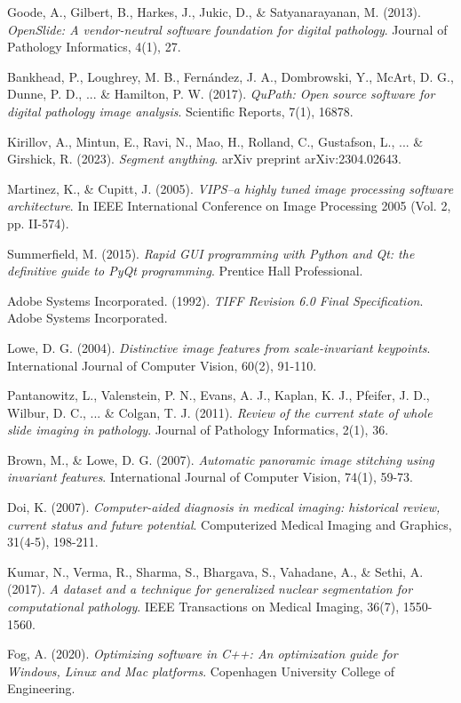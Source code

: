 \documentclass[12pt,a4paper]{report}
\begin{document}
\begin{thebibliography}{20}

Goode, A., Gilbert, B., Harkes, J., Jukic, D., \& Satyanarayanan, M. (2013). 
\textit{OpenSlide: A vendor-neutral software foundation for digital pathology}. 
Journal of Pathology Informatics, 4(1), 27.

Bankhead, P., Loughrey, M. B., Fernández, J. A., Dombrowski, Y., McArt, D. G., Dunne, P. D., ... \& Hamilton, P. W. (2017). 
\textit{QuPath: Open source software for digital pathology image analysis}. 
Scientific Reports, 7(1), 16878.

Kirillov, A., Mintun, E., Ravi, N., Mao, H., Rolland, C., Gustafson, L., ... \& Girshick, R. (2023). 
\textit{Segment anything}. 
arXiv preprint arXiv:2304.02643.

Martinez, K., \& Cupitt, J. (2005). 
\textit{VIPS–a highly tuned image processing software architecture}. 
In IEEE International Conference on Image Processing 2005 (Vol. 2, pp. II-574).

Summerfield, M. (2015). 
\textit{Rapid GUI programming with Python and Qt: the definitive guide to PyQt programming}. 
Prentice Hall Professional.

Adobe Systems Incorporated. (1992). 
\textit{TIFF Revision 6.0 Final Specification}. 
Adobe Systems Incorporated.

Lowe, D. G. (2004). 
\textit{Distinctive image features from scale-invariant keypoints}. 
International Journal of Computer Vision, 60(2), 91-110.

Pantanowitz, L., Valenstein, P. N., Evans, A. J., Kaplan, K. J., Pfeifer, J. D., Wilbur, D. C., ... \& Colgan, T. J. (2011). 
\textit{Review of the current state of whole slide imaging in pathology}. 
Journal of Pathology Informatics, 2(1), 36.

Brown, M., \& Lowe, D. G. (2007). 
\textit{Automatic panoramic image stitching using invariant features}. 
International Journal of Computer Vision, 74(1), 59-73.

Doi, K. (2007). 
\textit{Computer-aided diagnosis in medical imaging: historical review, current status and future potential}. 
Computerized Medical Imaging and Graphics, 31(4-5), 198-211.

Kumar, N., Verma, R., Sharma, S., Bhargava, S., Vahadane, A., \& Sethi, A. (2017). 
\textit{A dataset and a technique for generalized nuclear segmentation for computational pathology}. 
IEEE Transactions on Medical Imaging, 36(7), 1550-1560.

Fog, A. (2020). 
\textit{Optimizing software in C++: An optimization guide for Windows, Linux and Mac platforms}. 
Copenhagen University College of Engineering.

\end{thebibliography}
\end{document}

